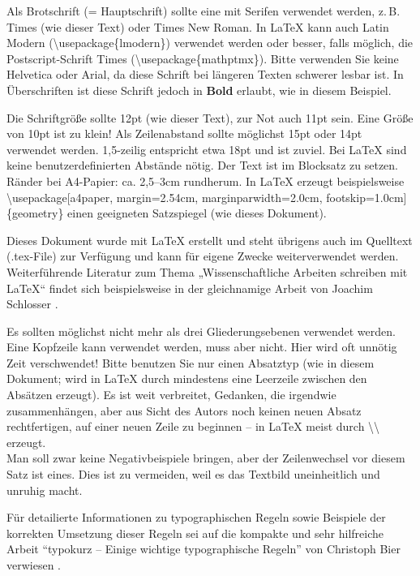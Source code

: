 \documentclass[
    12pt,
    headings=small,
    parskip=half,           %
    bibliography=totoc,
    numbers=noenddot,       %
    open=any,               %
    ]{scrreprt}
\begin{document}
Als Brotschrift (= Hauptschrift) sollte eine mit Serifen verwendet werden, z.\,B. Times (wie dieser Text) oder Times New Roman. In LaTeX kann auch Latin Modern (\textbackslash usepackage\{lmodern\}) verwendet werden oder besser, falls möglich, die Postscript-Schrift Times (\textbackslash usepackage\{mathptmx\}). Bitte verwenden Sie keine \textsf{Helvetica} oder \textsf{Arial}, da diese Schrift bei längeren Texten schwerer lesbar ist. In Überschriften ist diese Schrift jedoch in \textsf{\textbf{Bold}} erlaubt, wie in diesem Beispiel.

Die Schriftgröße sollte 12pt (wie dieser Text), zur Not auch 11pt sein. Eine Größe von 10pt ist zu klein! Als Zeilenabstand sollte möglichst 15pt oder 14pt verwendet werden. 1,5-zeilig entspricht etwa 18pt und ist zuviel. Bei LaTeX sind keine benutzerdefinierten Abstände nötig. Der Text ist im Blocksatz zu setzen. Ränder bei A4-Papier: ca. 2,5--3cm rundherum. In LaTeX erzeugt beispielsweise \textbackslash usepackage[a4paper, margin=2.54cm, marginparwidth=2.0cm, footskip=1.0cm]\{geometry\} einen geeigneten Satzspiegel (wie dieses Dokument).

Dieses Dokument wurde mit LaTeX erstellt und steht übrigens auch im Quelltext (.tex-File) zur Verfügung und kann für eigene Zwecke weiterverwendet werden. Weiterführende Literatur zum Thema „Wissenschaftliche Arbeiten schreiben mit LaTeX“ findet sich beispielsweise in der gleichnamige Arbeit von Joachim Schlosser \cite{Schl2011}.

Es sollten möglichst nicht mehr als drei Gliederungsebenen verwendet werden. Eine Kopfzeile kann verwendet werden, muss aber nicht. Hier wird oft unnötig Zeit verschwendet! Bitte benutzen Sie nur einen Absatztyp (wie in diesem Dokument; wird in LaTeX durch mindestens eine Leerzeile zwischen den Absätzen erzeugt). Es ist weit verbreitet, Gedanken, die irgendwie zusammenhängen, aber aus Sicht des Autors noch keinen neuen Absatz rechtfertigen, auf einer neuen Zeile zu beginnen -- in LaTeX meist durch {\textbackslash\textbackslash} erzeugt.\\ Man soll zwar keine Negativbeispiele bringen, aber der Zeilenwechsel vor diesem Satz ist eines. Dies ist zu vermeiden, weil es das Textbild uneinheitlich und unruhig macht.

Für detailierte Informationen zu typographischen Regeln sowie Beispiele der korrekten Umsetzung dieser Regeln sei auf die kompakte und sehr hilfreiche Arbeit "`typokurz -- Einige wichtige typographische Regeln"' von Christoph Bier verwiesen \cite{Bier2009}. %
\end{document}
